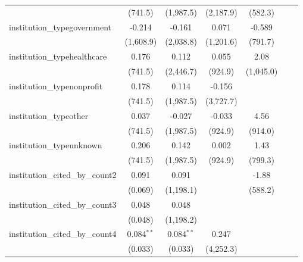 \begin{tabular}{lcccccc}
                                         & (741.5)      & (1,987.5)    & (2,187.9)      & (582.3)        &     &   \\   
   institution\_typegovernment           & -0.214       & -0.161       & 0.071          & -0.589         &     &   \\   
                                         & (1,608.9)    & (2,038.8)    & (1,201.6)      & (791.7)        &     &   \\   
   institution\_typehealthcare           & 0.176        & 0.112        & 0.055          & 2.08           &     &   \\   
                                         & (741.5)      & (2,446.7)    & (924.9)        & (1,045.0)      &     &   \\   
   institution\_typenonprofit            & 0.178        & 0.114        & -0.156         &                &     &   \\   
                                         & (741.5)      & (1,987.5)    & (3,727.7)      &                &     &   \\   
   institution\_typeother                & 0.037        & -0.027       & -0.033         & 4.56           &     &   \\   
                                         & (741.5)      & (1,987.5)    & (924.9)        & (914.0)        &     &   \\   
   institution\_typeunknown              & 0.206        & 0.142        & 0.002          & 1.43           &     &   \\   
                                         & (741.5)      & (1,987.5)    & (924.9)        & (799.3)        &     &   \\   
   institution\_cited\_by\_count2        & 0.091        & 0.091        &                & -1.88          &     &   \\   
                                         & (0.069)      & (1,198.1)    &                & (588.2)        &     &   \\   
   institution\_cited\_by\_count3        & 0.048        & 0.048        &                &                &     &   \\   
                                         & (0.048)      & (1,198.2)    &                &                &     &   \\   
   institution\_cited\_by\_count4        & 0.084$^{**}$ & 0.084$^{**}$ & 0.247          &                &     &   \\   
                                         & (0.033)      & (0.033)      & (4,252.3)      &                &     &   \\   

\end{tabular}
